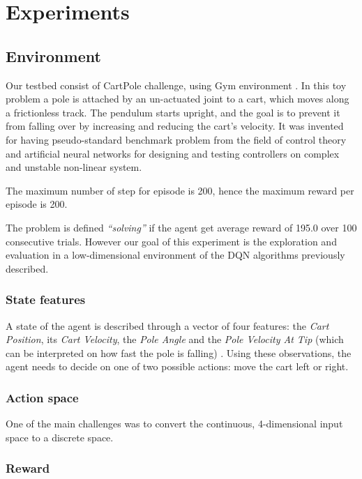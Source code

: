 \section{Experiments}

\subsection{Environment}
Our testbed consist of CartPole challenge, using Gym environment \cite{Gym}.
In this toy problem a pole is attached by an un-actuated joint to a cart, which moves along a frictionless track. The pendulum starts upright, and the goal is to prevent it from falling over by increasing and reducing the cart's velocity. It was invented for having pseudo-standard benchmark problem from the field of control theory and artificial neural networks for designing and testing controllers on complex and unstable non-linear system.

The maximum number of step for episode is 200, hence the maximum reward per episode is 200.

The problem is defined \textit{``solving''} if the agent get average reward of 195.0 over 100 consecutive trials. However our goal of this experiment is the exploration and evaluation in a low-dimensional environment of the DQN algorithms previously described.
 
\subsubsection{State features}

A state of the agent is described through a vector of four features: the  \textit{Cart Position}, its \textit{Cart Velocity}, the \textit{Pole Angle} and the \textit{Pole Velocity At Tip} (which can be interpreted on how fast the pole is falling) .
Using these observations, the agent needs to decide on one of two possible actions: move the cart left or right.

\subsubsection{Action space}
One of the main challenges was to convert the continuous, 4-dimensional input space to a discrete space. 


\subsubsection{Reward}

